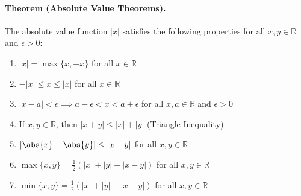 \documentclass[openany]{book}
\numberwithin{equation}{section}
\begin{document}
\paragraph{Theorem (Absolute Value Theorems).}
 The absolute value function $|x|$ satisfies the following properties for all $x, y \in \mathbb{R}$ and $\epsilon > 0$:
    \begin{enumerate}
        \item $\left| x \right| = \max\{x, -x\}$ for all $x \in \mathbb{R}$
        \item $-\left| x \right| \leq x \leq \left| x \right|$ for all $x \in \mathbb{R}$
        \item $\left| x - a \right| < \epsilon \implies a - \epsilon < x < a + \epsilon$ for all $x, a \in \mathbb{R}$ and $\epsilon > 0$
        \item If $x, y \in \mathbb{R}$, then $\left| x + y \right| \leq \left| x \right| + \left| y \right|$ (Triangle Inequality)
        \item $\left| \abs{x} - \abs{y} \right| \leq \left| x - y \right|$ for all $x, y \in \mathbb{R}$
        \item $\max\{x, y\} = \frac{1}{2}(|x| + |y| + |x - y|)$ for all $x, y \in \mathbb{R}$
        \item $\min\{x, y\} = \frac{1}{2}(|x| + |y| - |x - y|)$ for all $x, y \in \mathbb{R}$
    \end{enumerate}
\par
\end{document}

